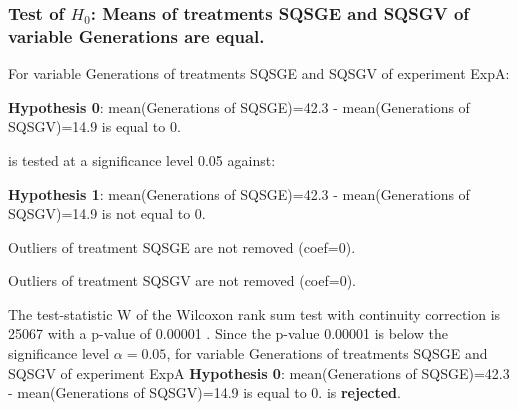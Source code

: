 \begin{frame}[t]
 \frametitle{Test of $H_{0}$: Means of treatments SQSGE and SQSGV of variable Generations are equal. }
 \scriptsize
 For variable Generations of treatments SQSGE and SQSGV of experiment ExpA:

\vspace{1mm}
{\bf Hypothesis 0}: mean(Generations of SQSGE)=42.3 - mean(Generations of SQSGV)=14.9 is equal to 0.


 \begin{center} is tested at a significance level 0.05 against: \end{center}

{\bf Hypothesis 1}: mean(Generations of SQSGE)=42.3 - mean(Generations of SQSGV)=14.9 is not equal to 0.
\vspace{1mm}
\vspace{1mm}

 Outliers of treatment SQSGE  are not removed (coef=0).

 Outliers of treatment SQSGV  are not removed (coef=0).
\vspace{1mm}
 
 The test-statistic W of the Wilcoxon rank sum test with continuity correction is 25067 with a p-value of 0.00001 .
 Since the p-value 0.00001 is below the significance level $\alpha= 0.05 $,
 for variable Generations of treatments SQSGE and SQSGV of experiment ExpA 
 {\bf Hypothesis 0}: mean(Generations of SQSGE)=42.3 - mean(Generations of SQSGV)=14.9 is equal to 0.
is {\bf rejected}.

 \end{frame}
